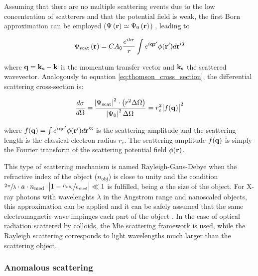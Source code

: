 Assuming that there are no multiple scattering events due to the low concentration of scatterers and that the potential field is weak, the first Born approximation can be employed ($ \Psi\left( \boldsymbol{\mathbf{r}} \right) \simeq \Psi_0\left( \boldsymbol{\mathbf{r}} \right)$) \citep{cowley_diffraction_1995}, leading to

\begin{equation}
       \Psi_{\text{scat}}\left( \boldsymbol{\mathbf{r}} \right)=C A_0 \frac{e^{i k r}}{r} \int e^{ i \boldsymbol{\mathbf{q}}\boldsymbol{\mathbf{r}}' }  \phi(\boldsymbol{\mathbf{r}}')  d\boldsymbol{\mathbf{r}}'^3
\end{equation}

where $\boldsymbol{\mathbf{q}}=\boldsymbol{\mathbf{k_s}} - \boldsymbol{\mathbf{k}}$ is the momentum transfer vector and $\boldsymbol{\mathbf{k_s}}$ the scattered wavevector. Analogously to equation \ref{eq:thomson_cross_section}, the differential scattering cross-section is:

\begin{equation}
        \label{eq:rayleigh_cross_section}
        \frac{d\sigma}{d\Omega}= \frac{\abs{\Psi_{\text{scat}}}^2 \cdot \left(r^2 \Delta \Omega \right)}{\abs{\Psi_{0}}^2\Delta \Omega}=r_e^2 \abs{f(\boldsymbol{\mathbf{q}})}^2
\end{equation}

where $f(\boldsymbol{\mathbf{q}})=\int e^{ i \boldsymbol{\mathbf{q}}\boldsymbol{\mathbf{r}}' }  \phi(\boldsymbol{\mathbf{r}}')  d\boldsymbol{\mathbf{r}}'^3$ is the scattering amplitude and the scattering length is the classical electron radius $r_e$. The scattering amplitude  $f(\boldsymbol{\mathbf{q}})$ is simply the Fourier transform of the scattering potential field $\phi(\boldsymbol{\mathbf{r}})$. 

This type of scattering mechanism is named Rayleigh-Gans-Debye when the refractive index of the object ($n_{\text{obj}}$) is close to unity and the condition $\sfrac{2\pi}{\lambda} \cdot a \cdot n_{\text{med}} \cdot \abs{1-\sfrac{n_{\text{obj}}}{n_{\text{med}}}}\ll1$ is fulfilled, being $a$ the size of the object. For X-ray photons with wavelenghts $\lambda$ in the Angstrom range and nanoscaled objects, this approximation can be applied and it can be safely assumed that the same electromagnetic wave impinges each part of the object \citep{hulst_light_1957, barber_rayleigh-gans-debye_1978}. In the case of optical radiation scattered by colloids, the Mie scattering framework is used, while the Rayleigh scattering corresponds to light wavelengths much larger than the scattering object.

\subsubsection{Anomalous scattering}

